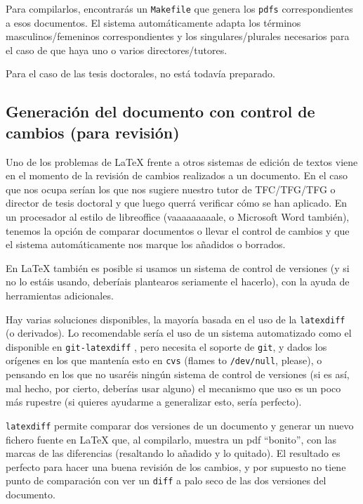 Para compilarlos, encontrarás un \texttt{Makefile} que genera los \texttt{pdfs} correspondientes a esos documentos. El sistema automáticamente adapta los términos masculinos/femeninos correspondientes y los singulares/plurales necesarios para el caso de que haya uno o varios directores/tutores.

Para el caso de las tesis doctorales, no está todavía preparado.


\subsection{Generación del documento con control de cambios (para revisión)}
\label{sec:control-de-cambios}

Uno de los problemas de \LaTeX{} frente a otros sistemas de edición de textos viene en el momento de la revisión de cambios realizados a un documento. En el caso que nos ocupa serían los que nos sugiere nuestro tutor de TFC/TFG/TFG o director de tesis doctoral y que luego querrá verificar cómo se han aplicado. En un procesador al estilo de libreoffice (vaaaaaaaaale, o Microsoft Word también), tenemos la opción de comparar documentos o llevar el control de cambios y que el sistema automáticamente nos marque los añadidos o borrados.

En \LaTeX{} también es posible si usamos un sistema de control de versiones (y si no lo estáis usando, deberíais plantearos seriamente el hacerlo), con la ayuda de herramientas adicionales.

Hay varias soluciones disponibles, la mayoría basada en el uso de la \texttt{latexdiff}~\cite{latexdiff} (o derivados). Lo recomendable sería el uso de un sistema automatizado como el disponible en \texttt{git-latexdiff} \cite{git-latexdiff}, pero necesita el soporte de \texttt{git}, y dados los orígenes en los que mantenía esto en \texttt{cvs} (flames to \texttt{/dev/null}, please), o pensando en los que no usaréis ningún sistema de control de versiones (si es así, mal hecho, por cierto, deberías usar alguno) el mecanismo que uso es un poco más rupestre (si quieres ayudarme a generalizar esto, sería perfecto).

\texttt{latexdiff} permite comparar dos versiones de un documento y generar un nuevo fichero fuente en \LaTeX{} que, al compilarlo, muestra un pdf ``bonito'', con las marcas de las diferencias (resaltando lo añadido y lo quitado). El resultado es perfecto para hacer una buena revisión de los cambios, y por supuesto no tiene punto de comparación con ver un \texttt{diff} a palo seco de las dos versiones del documento.

